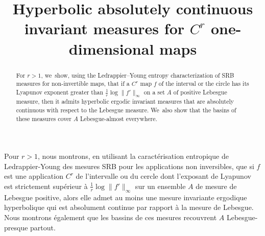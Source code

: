 \documentclass[JEP,XML,SOM,Unicode,NoFloatCountersInSection,published]{cedram}
\theoremstyle{definition}
\begin{document}
\title[Hyperbolic absolutely continuous invariant measures for $C^r$ one-dimensional maps]{Hyperbolic absolutely continuous invariant measures for $C^r$ one-dimensional maps}

\author[\initial{A.} \lastname{Delplanque}]{ }
\address{Sorbonne Université and Université Paris Cité, CNRS, Laboratoire de Probabilités, Statistique et Modélisation,\\
F-75005 Paris, France}
\urladdr{}

\begin{abstract}
For $r > 1$, we~show, using the Ledrappier--Young entropy characterization of SRB measures for non-invertible maps, that if a $C^r$ map $f$ of the interval or the circle has its Lyapunov exponent greater than $\frac{1}{r} \log \| f' \|_{\infty}$ on a set $A$ of positive Lebesgue measure, then it admits hyperbolic ergodic invariant measures that are absolutely continuous with respect to the Lebesgue measure. We~also show that the basins of these measures cover $A$ Lebesgue-almost everywhere.
\end{abstract}





\begin{altabstract}
Pour $r > 1$, nous montrons, en utilisant la caractérisation entropique de Ledrappier-Young des mesures SRB pour les applications non inversibles, que si $f$ est une application $C^r$ de l'intervalle ou du cercle dont l'exposant de Lyapunov est strictement supérieur à $\frac{1}{r} \log \| f' \|_{\infty}$ sur un ensemble $A$ de mesure de Lebesgue positive, alors elle admet au moins une mesure invariante ergodique hyperbolique qui est absolument continue par rapport à la mesure de Lebesgue. Nous montrons également que les bassins de ces mesures recouvrent $A$ Lebesgue-presque partout.
\end{altabstract}

\maketitle
\vspace*{-\baselineskip}
\tableofcontents
\end{document}
